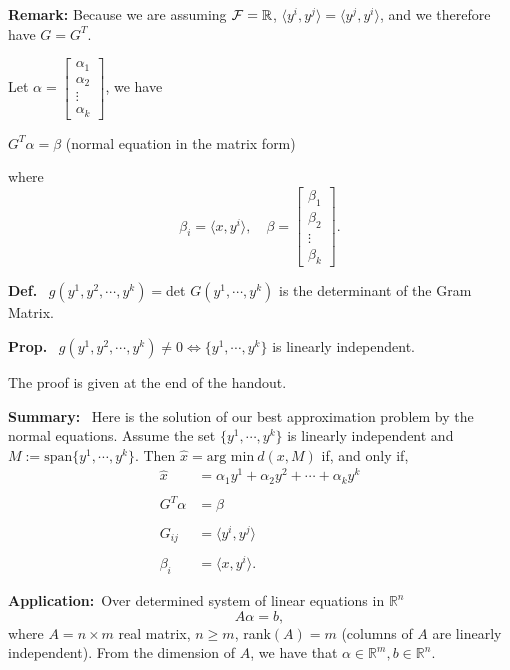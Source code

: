 \documentclass[letterpaper]{article}
\newcommand{\spanof}[1]{\textrm{span} \{ #1 \}}
\begin{document}
\noindent \textbf{Remark:} Because we are assuming $\cal F =\mathbb{R} $,  $ \langle y^i,y^j \rangle = \langle y^j,y^i \rangle $, and we therefore have $G=G^T$.

Let $\alpha=\begin{bmatrix} \alpha_1 \\ \alpha_2 \\ \vdots \\ \alpha_k  \end{bmatrix}$,  we have
\begin{center}
$G^T \alpha=\beta $ (normal equation in the matrix form)\\
\end{center}
where
$$\beta_i= \langle x,y^i \rangle ,\quad \beta=\begin{bmatrix} \beta_1 \\ \beta_2 \\ \vdots \\ \beta_k  \end{bmatrix}.$$

\newpage

\noindent \textbf{Def.}~ $g(y^1,y^2,\cdots,y^k)=$det $G(y^1,\cdots,y^k)$ is the determinant of the Gram Matrix.

\noindent \textbf{Prop.}~ $g(y^1,y^2,\cdots,y^k) \neq 0 \Leftrightarrow \{ y^1,\cdots, y^k \}$ is linearly independent.

\noindent The proof is given at the end of the handout.

\noindent \textbf{Summary:}~ Here is the solution of our best approximation problem by the normal equations. Assume the set $\{ y^1,\cdots, y^k \}$ is linearly independent and $M:=\spanof{y^1,\cdots, y^k }$. Then
$\hat{x} = \text{arg~min}~ d(x,M)$ if, and only if,
\begin{align*}
\hat{x} &= \alpha_1 y^1+ \alpha_2 y^2+ \cdots +\alpha_k y^k \\
\\
G^T \alpha &=\beta \\
\\
G_{ij}&= \langle y^i,y^j \rangle \\
\\
\beta_i &= \langle x,y^i \rangle.
\end{align*}

\newpage

\noindent \textbf{Application:}~Over determined system of linear equations in $\mathbb{R}^n$
$$A \alpha=b,$$
where $A=n \times m$ real matrix,  $n \geq m$, rank$(A)=m$ (columns of $A$ are linearly independent). From the dimension of $A$, we have that $\alpha \in \mathbb{R}^m , b \in \mathbb{R}^n$.
\end{document}
